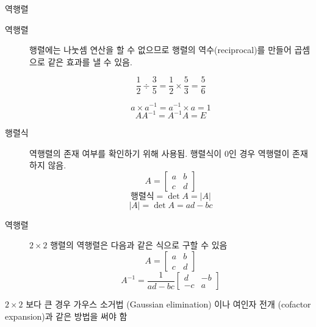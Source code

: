 \documentclass[10pt,t]{beamer}
\begin{document}
\begin{frame}{역행렬}
    \begin{description}
        \item[역행렬] 행렬에는 나눗셈 연산을 할 수 없으므로 행렬의 역수(reciprocal)를 만들어 곱셈으로 같은 효과를 낼 수 있음.  

        \[\frac{1}{2} \div \frac{3}{5} = \frac{1}{2} \times \frac{5}{3} = \frac{5}{6} \] 

        \[a \times a ^{-1} = a^{-1} \times a = 1 \]
        \[ A A^{-1} = A^{-1} A = E\]
        \item[행렬식] 역행렬의 존재 여부를 확인하기 위해 사용됨. 행렬식이 0인 경우 역행렬이 존재하지 않음. 
        \[A = \begin{bmatrix}
            a & b \\
            c & d
        \end{bmatrix}\]
        \[ \text{행렬식}= \det A = |A| \]
        \[|A| = \det A = ad-bc \]
    \end{description}

    \pagebreak
    \begin{description}
        \item[역행렬] $2\times 2$ 행렬의 역행렬은 다음과 같은 식으로 구할 수 있음
        \[A = \begin{bmatrix}
            a & b\\
            c & d 
        \end{bmatrix}\] 
        \[A^{-1} = \frac{1}{ad-bc} \begin{bmatrix}
            d & -b \\
            -c & a
        \end{bmatrix}\]
    \end{description}
    $2\times 2$  보다 큰 경우 가우스 소거법 (Gaussian elimination) 이나 여인자 전개 (cofactor expansion)과 같은 방법을 써야 함
\end{frame}
\end{document}
